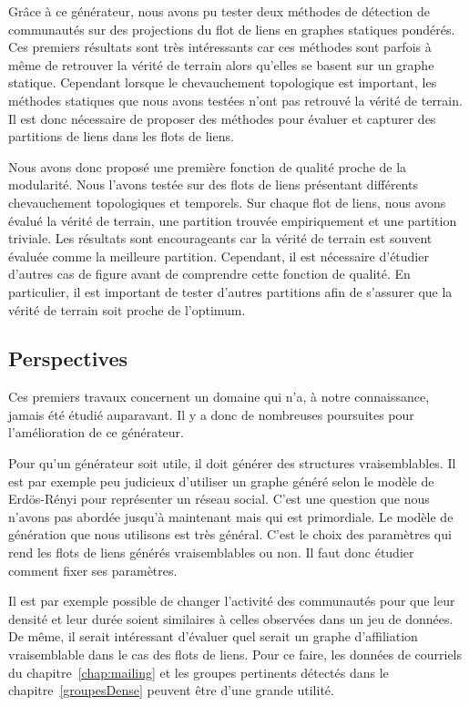 Grâce à ce générateur, nous avons pu tester deux méthodes de détection de communautés sur des projections du flot de liens en graphes statiques pondérés.
Ces premiers résultats sont très intéressants car ces méthodes sont parfois à même de retrouver la vérité de terrain alors qu'elles se basent sur un graphe statique.
Cependant lorsque le chevauchement topologique est important, les méthodes statiques que nous avons testées n'ont pas retrouvé la vérité de terrain.
Il est donc nécessaire de proposer des méthodes pour évaluer et capturer des partitions de liens dans les flots de liens.

Nous avons donc proposé une première fonction de qualité proche de la modularité.
Nous l'avons testée sur des flots de liens présentant différents chevauchement topologiques et temporels.
Sur chaque flot de liens, nous avons évalué la vérité de terrain, une partition trouvée empiriquement et une partition triviale.
Les résultats sont encourageants car la vérité de terrain est souvent évaluée comme la meilleure partition.
Cependant, il est nécessaire d'étudier d'autres cas de figure avant de comprendre cette fonction de qualité.
En particulier, il est important de tester d'autres partitions afin de s'assurer que la vérité de terrain soit proche de l'optimum.


\subsection{Perspectives}
Ces premiers travaux concernent un domaine qui n'a, à notre connaissance, jamais été étudié auparavant.
Il y a donc de nombreuses poursuites pour l'amélioration de ce générateur.


Pour qu'un générateur soit utile, il doit générer des structures vraisemblables.
Il est par exemple peu judicieux d'utiliser un graphe généré selon le modèle de Erdös-Rényi pour représenter un réseau social.
C'est une question que nous n'avons pas abordée jusqu'à maintenant mais qui est primordiale.
Le modèle de génération que nous utilisons est très général.
C'est le choix des paramètres qui rend les flots de liens générés vraisemblables ou non.
Il faut donc étudier comment fixer ses paramètres.

Il est par exemple possible de changer l'activité des communautés pour que leur densité et leur durée soient similaires à celles observées dans un jeu de données.
De même, il serait intéressant d'évaluer quel serait un graphe d'affiliation vraisemblable dans le cas des flots de liens.
Pour ce faire, les données de courriels du chapitre~\ref{chap:mailing} et les groupes pertinents détectés dans le chapitre~\ref{groupesDense} peuvent être d'une grande utilité.

